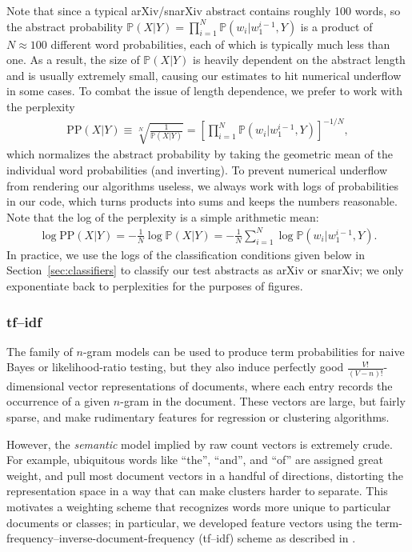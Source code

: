 \documentclass{article}
\renewcommand{\P}{\mathbb{P}}
\begin{document}
Note that since a typical arXiv/snarXiv abstract contains roughly 100 words, so the abstract probability $\P(X|Y)=\prod_{i=1}^N \P(w_i|w_1^{i-1},Y)$ is a product of $N\approx100$ different word probabilities, each of which is typically much less than one.
As a result, the size of $\P(X|Y)$ is heavily dependent on the abstract length and is usually extremely small, causing our estimates to hit numerical underflow in some cases.
To combat the issue of length dependence, we prefer to work with the perplexity
\begin{align}
  \text{PP}(X|Y) \equiv \sqrt[N]{\frac{1}{\P(X|Y)}} = \left[ \prod_{i=1}^N \P(w_i|w_1^{i-1},Y) \right]^{-1/N},
\end{align}
which normalizes the abstract probability by taking the geometric mean of the individual word probabilities (and inverting).
To prevent numerical underflow from rendering our algorithms useless, we always work with logs of probabilities in our code, which turns products into sums and keeps the numbers reasonable.
Note that the log of the perplexity is a simple arithmetic mean:
\begin{align}
  \log\text{PP}(X|Y) = -\frac{1}{N}\log\P(X|Y) = -\frac{1}{N} \sum_{i=1}^N \log\P(w_i|w_1^{i-1},Y).
\end{align}
In practice, we use the logs of the classification conditions given below in Section~\ref{sec:classifiers} to classify our test abstracts as arXiv or snarXiv; we only exponentiate back to perplexities for the purposes of figures.




\subsubsection{tf--idf}
The family of $n$-gram models can be used to produce term probabilities for naive Bayes or likelihood-ratio testing, but they also induce perfectly good $\tfrac{V!}{(V-n)!}$-dimensional vector representations of documents, where each entry records the occurrence of a given $n$-gram in the document.
These vectors are large, but fairly sparse, and make rudimentary features for regression or clustering algorithms.

However, the \emph{semantic} model implied by raw count vectors is extremely crude. For example, ubiquitous words like ``the'', ``and'', and ``of'' are assigned great weight, and pull most document vectors in a handful of directions, distorting the representation space in a way that can make clusters harder to separate.
This motivates a weighting scheme that recognizes words more unique to particular documents or classes; in particular, we developed feature vectors using the term-frequency--inverse-document-frequency (tf--idf) scheme as described in \citet[ch. 6]{jurafsky2014speech}.
\end{document}
